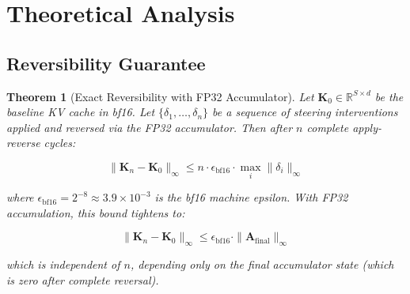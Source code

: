 \documentclass{article}
\newtheorem{theorem}{Theorem}
\begin{document}
\begin{itemize}[leftmargin=*]
\end{itemize}

\section{Theoretical Analysis}

\subsection{Reversibility Guarantee}

\begin{theorem}[Exact Reversibility with FP32 Accumulator]
\label{thm:reversibility}
Let $\mathbf{K}_0 \in \mathbb{R}^{S \times d}$ be the baseline KV cache in bf16. Let $\{\delta_1, \ldots, \delta_n\}$ be a sequence of steering interventions applied and reversed via the FP32 accumulator. Then after $n$ complete apply-reverse cycles:

\begin{equation}
\|\mathbf{K}_n - \mathbf{K}_0\|_\infty \leq n \cdot \epsilon_{\text{bf16}} \cdot \max_i \|\delta_i\|_\infty
\label{eq:reversibility_naive}
\end{equation}

where $\epsilon_{\text{bf16}} = 2^{-8} \approx 3.9 \times 10^{-3}$ is the bf16 machine epsilon. With FP32 accumulation, this bound tightens to:

\begin{equation}
\|\mathbf{K}_n - \mathbf{K}_0\|_\infty \leq \epsilon_{\text{bf16}} \cdot \|\mathbf{A}_{\text{final}}\|_\infty
\label{eq:reversibility_fp32}
\end{equation}

which is independent of $n$, depending only on the final accumulator state (which is zero after complete reversal).
\end{theorem}
\end{document}
